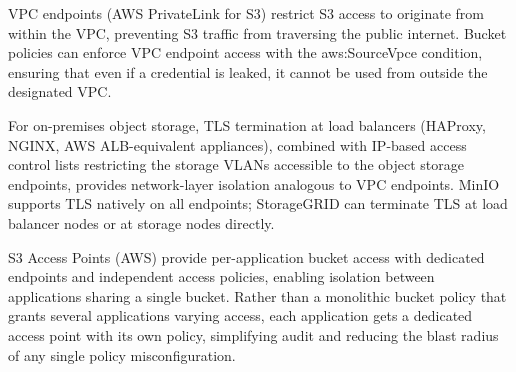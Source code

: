 VPC endpoints (AWS PrivateLink for S3) restrict S3 access to originate from within the VPC, preventing S3 traffic from traversing the public internet. Bucket policies can enforce VPC endpoint access with the aws:SourceVpce condition, ensuring that even if a credential is leaked, it cannot be used from outside the designated VPC.

For on-premises object storage, TLS termination at load balancers (HAProxy, NGINX, AWS ALB-equivalent appliances), combined with IP-based access control lists restricting the storage VLANs accessible to the object storage endpoints, provides network-layer isolation analogous to VPC endpoints. MinIO supports TLS natively on all endpoints; StorageGRID can terminate TLS at load balancer nodes or at storage nodes directly.

S3 Access Points (AWS) provide per-application bucket access with dedicated endpoints and independent access policies, enabling isolation between applications sharing a single bucket. Rather than a monolithic bucket policy that grants several applications varying access, each application gets a dedicated access point with its own policy, simplifying audit and reducing the blast radius of any single policy misconfiguration.

